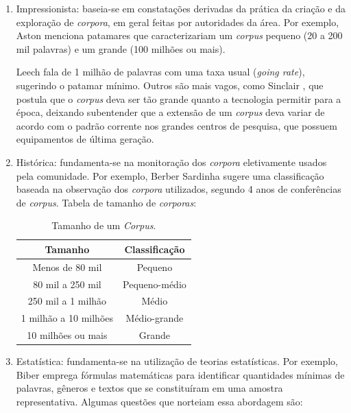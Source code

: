 \begin{enumerate}
\item Impressionista: baseia-se em constatações derivadas da prática da criação e da exploração de \emph{corpora}, em geral feitas por autoridades da área. Por exemplo, Aston \cite{aston97} menciona patamares que caracterizariam um \emph{corpus} pequeno (20 a 200 mil palavras) e um grande (100 milhões ou mais).

Leech \cite{leech91} fala de 1 milhão de palavras com uma taxa usual (\emph{going rate}), sugerindo o patamar mínimo. Outros são mais vagos, como Sinclair \cite{sinclair97}, que postula que o \emph{corpus} deva ser tão grande quanto a tecnologia permitir para a época, deixando subentender que a extensão de um \emph{corpus} deva variar de acordo com o padrão corrente nos grandes centros de pesquisa, que possuem equipamentos de última geração.

\item Histórica: fundamenta-se na monitoração dos \emph{corpora} eletivamente usados pela comunidade. Por exemplo, Berber Sardinha \cite{sardinha04} sugere uma classificação baseada na observação dos \emph{corpora} utilizados, segundo 4 anos de conferências de \emph{corpus}. Tabela de tamanho de \emph{corporas}:
\\

\begin{table}[H]
   \centering
   \small
   \caption{Tamanho de um \emph{Corpus}.}

   \begin{tabular}{| c | c |}
      \hline
        \textbf{Tamanho} & \textbf{Classificação}\\
        \hline
        \hline
        Menos de 80 mil & Pequeno\\
        \hline
        80 mil a 250 mil & Pequeno-médio\\
        \hline
        250 mil a 1 milhão & Médio\\
        \hline
        1 milhão a 10 milhões & Médio-grande\\
        \hline
        10 milhões ou mais & Grande\\
        \hline

   \end{tabular}

\end{table}


\item Estatística: fundamenta-se na utilização de teorias estatísticas. Por exemplo, Biber \cite{biber93} emprega fórmulas matemáticas para identificar quantidades mínimas de palavras, gêneros e textos que se constituíram em uma amostra representativa. Algumas questões que norteiam essa abordagem são:


\end{enumerate}
